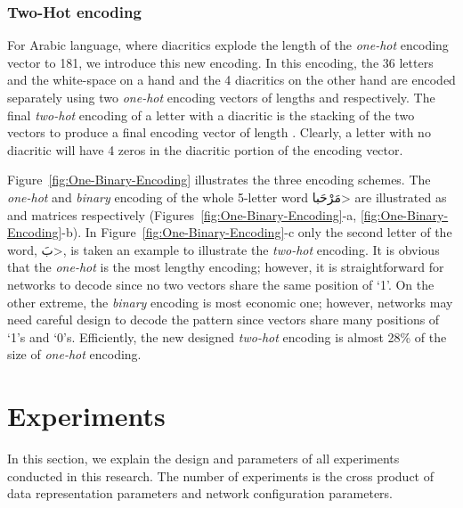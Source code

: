 \documentclass[journal,10pt,twocolumns,letter]{IEEEtran}
\begin{document}
\subsubsection{Two-Hot encoding}\label{sec:two-hot-encoding}
For Arabic language, where diacritics explode the length of the \textit{one-hot} encoding vector to
181, we introduce this new encoding. In this encoding, the 36 letters and the white-space on a hand
and the 4 diacritics on the other hand are encoded separately using two \textit{one-hot} encoding
vectors of lengths  and  respectively. The final \textit{two-hot} encoding of a
letter with a diacritic is the stacking of the two vectors to produce a final encoding vector of
length . Clearly, a letter with no diacritic will have 4 zeros in the diacritic portion
of the encoding vector.

Figure~\ref{fig:One-Binary-Encoding} illustrates the three encoding schemes. The \textit{one-hot}
and \textit{binary} encoding of the whole 5-letter word \<مَرْحَبا> are illustrated as
 and  matrices respectively (Figures~\ref{fig:One-Binary-Encoding}-a,
\ref{fig:One-Binary-Encoding}-b). In Figure~\ref{fig:One-Binary-Encoding}-c only the second letter
of the word, \<بَ>, is taken an example to illustrate the \textit{two-hot} encoding. It is
obvious that the \textit{one-hot} is the most lengthy encoding; however, it is straightforward for
networks to decode since no two vectors share the same position of `1'. On the other extreme, the
\textit{binary} encoding is most economic one; however, networks may need careful design to decode
the pattern since vectors share many positions of `1's and `0's. Efficiently, the new designed
\textit{two-hot} encoding is almost 28\% of the size of \textit{one-hot} encoding.








\section{Experiments}\label{sec:model}
In this section, we explain the design and parameters of all experiments conducted in this
research. The number of experiments is the cross product of data representation parameters and
network configuration parameters.
\end{document}
